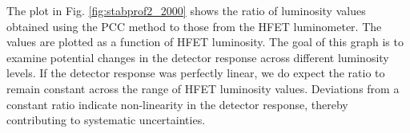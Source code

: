 \begin{itemize}

  

The plot in Fig. \ref{fig:stabprof2_2000} shows the ratio of luminosity values obtained using the PCC method to those from the HFET luminometer. The values are plotted as a function of HFET luminosity. The goal of this graph is to examine potential changes in the detector response across different luminosity levels. If the detector response was perfectly linear, we do expect the ratio to remain constant across the range of HFET luminosity values. Deviations from a constant ratio indicate non-linearity in the detector response, thereby contributing to systematic uncertainties.


\end{itemize}
